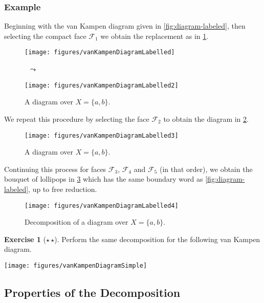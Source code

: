\documentclass[11pt,a4paper,reqno]{amsart}
\theoremstyle{plain}
\theoremstyle{definition}
\theoremstyle{definition}
\newtheorem{exercise}[theorem]{Exercise}
\newcommand\exerciseLevelMedium{$\star${\,}$\star$}
\begin{document}
\subsubsection{Example}

Beginning with the van Kampen diagram given in \cref{fig:diagram-labeled}, then selecting the compact face $\mathcal F_1$ we obtain the replacement as in \cref{fig:diagram2}.

\begin{figure}[ht!]
	\centering
	\begin{minipage}{.4\linewidth}
    \texttt{[image: figures/vanKampenDiagramLabelled]}
		\hfill
	\end{minipage}
	~{\Large$\leadsto$}~
	\begin{minipage}{.4\linewidth}
		\hfill
    \texttt{[image: figures/vanKampenDiagramLabelled2]}
	\end{minipage}
	\caption{A diagram over $X = \{a,b\}$.}\label{fig:diagram2}
\end{figure}

We repeat this procedure by selecting the face $\mathcal F_2$ to obtain the diagram in \cref{fig:diagram3}.

\begin{figure}[ht!]
	\centering
  \texttt{[image: figures/vanKampenDiagramLabelled3]}
	\caption{A diagram over $X = \{a,b\}$.}\label{fig:diagram3}
\end{figure}

Continuing this process for faces $\mathcal F_3$, $\mathcal F_4$ and $\mathcal F_5$ (in that order), we obtain the bouquet of lollipops in \cref{fig:diagram4}  which has the same boundary word as \cref{fig:diagram-labeled}, up to free reduction.

\begin{figure}[ht!]
	\centering
  \texttt{[image: figures/vanKampenDiagramLabelled4]}
	\caption{Decomposition of a diagram over $X = \{a,b\}$.}\label{fig:diagram4}
\end{figure}

\begin{exercise}[\exerciseLevelMedium]
  Perform the same decomposition for the following van Kampen diagram.
  
  \begin{center}
	  \texttt{[image: figures/vanKampenDiagramSimple]}
  \end{center}
\end{exercise}

\subsection{Properties of the Decomposition}
\end{document}
